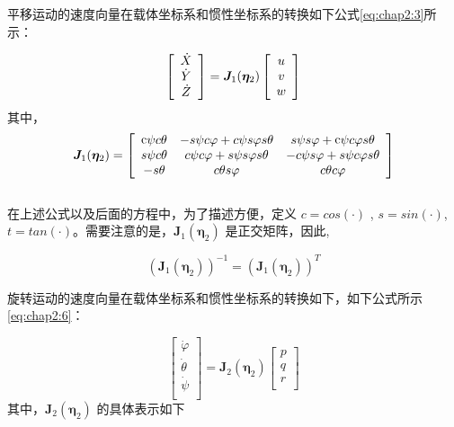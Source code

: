 平移运动的速度向量在载体坐标系和惯性坐标系的转换如下公式\ref{eq:chap2:3}所示：

\begin{equation}
\centering
\label{eq:chap2:3}
\left[ {\begin{array}{*{20}{c}}
   {\dot X}  \\
   {\dot Y}  \\
   {\dot Z}  \\
\end{array}} \right] =
 {{\bm{J}}_{1}(\bm{\eta}_{2})}
\left[ {\begin{array}{*{20}{c}}
   u  \\
   v  \\
   w  \\
\end{array}} \right]
\end{equation}
其中，
\begin{equation*}
\centering
\label{eq:chap2:4}
{{\bm{J}}_{1}(\bm{\eta} _{2})} =
\left[
{\begin{array}{*{20}{c}}
   {{\mathop{\rm c}\nolimits}  \psi  c \theta  } & { - s \psi  c \varphi   + c \psi  s \varphi  s \theta  } & {s \psi  s \varphi   + {\mathop{\rm c}\nolimits}  \psi  c \varphi  s \theta  }  \\
   {s \psi  c \theta  } & {c \psi  c \varphi   + s \psi  s \varphi  s \theta  } & { - c \psi  s \varphi   + s \psi  c \varphi  s \theta  }  \\
   { - s \theta  } & {c \theta  s \varphi  } & {c \theta  c \varphi  }  \\
\end{array}}
\right]
\end{equation*}
\\
在上述公式以及后面的方程中，为了描述方便，定义 $ c= cos(·)$ ,  $s = sin(·)$, $t = tan(·)$。需要注意的是，${{\bm{J}}_{1}(\bm{\eta} _{2})}$ 是正交矩阵，因此,

\begin{equation}
\label{eq:chap2:5}
({{\bm{J}}_{1}(\bm{\eta} _{2})})^{-1} = ({{\bm{J}}_{1}(\bm{\eta} _{2})})^T
\end{equation}

旋转运动的速度向量在载体坐标系和惯性坐标系的转换如下，如下公式所示\ref{eq:chap2:6}：

\begin{equation}
\label{eq:chap2:6}
\left[ {\begin{array}{*{20}{c}}
   \dot \varphi   \\
   \dot \theta   \\
   \dot \psi   \\
\end{array}} \right] = {\bm{J}_2(\bm{\eta}_2)}
\left[ {\begin{array}{*{20}{c}}
   p  \\
   q  \\
   r  \\
\end{array}} \right]
\end{equation}
其中，${\bm{J}_2(\bm{\eta}_2)}$ 的具体表示如下

